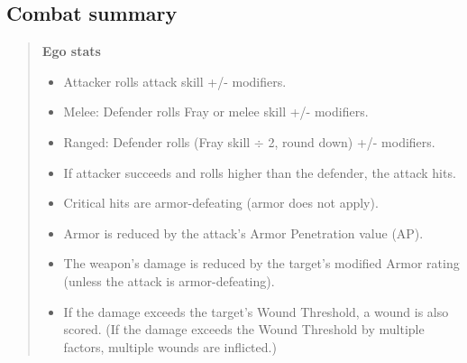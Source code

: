 \subsection{Combat summary}

\begin{quotation}
\textbf{Ego stats}
\begin{itemize}
\item Attacker rolls attack skill +/- modifiers.
\item Melee: Defender rolls Fray or melee skill +/- modifiers.
\item Ranged: Defender rolls (Fray skill $\div$ 2, round down) +/- modifiers.
\item If attacker succeeds and rolls higher than the defender, the attack hits.
\item Critical hits are armor-defeating (armor does not apply).
\item Armor is reduced by the attack’s Armor Penetration value (AP).
\item The weapon’s damage is reduced by the target’s modified Armor rating (unless the attack is armor-defeating).
\item If the damage exceeds the target’s Wound Threshold, a wound is also scored. (If the damage exceeds the Wound Threshold by multiple factors, multiple wounds are inflicted.)
\end{itemize}
\end{quotation}

